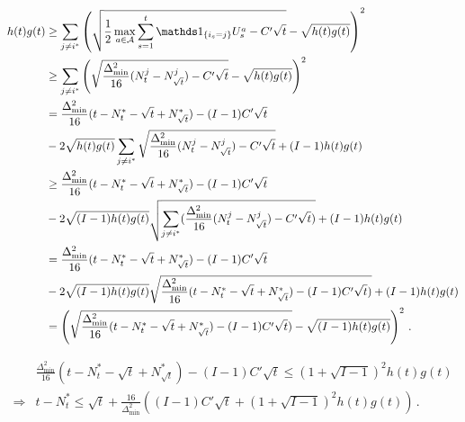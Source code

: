 \begin{align*}
    h(t)g(t) &\ge \sum_{j\neq i^*} \left(\sqrt{\frac{1}{2}\max_{a\in \mathcal A} \sum_{s=1}^t \ind_{\{i_s=j\}} U_s^a - C'\sqrt{t}} - \sqrt{h(t)g(t)}\right)^2\\
    &\ge \sum_{j\neq i^*} \left(\sqrt{\frac{\Delta_{\min}^2}{16} (N_t^j - N_{\sqrt{t}}^j) - C'\sqrt{t}} - \sqrt{h(t)g(t)}\right)^2\\
    &= \frac{\Delta_{\min}^2}{16} (t - N_t^* - \sqrt{t} + N_{\sqrt{t}}^*) - (I-1)C'\sqrt{t}\\
    &- 2\sqrt{h(t)g(t)}\sum_{j\neq i^*}\sqrt{\frac{\Delta_{\min}^2}{16} (N_t^j - N_{\sqrt{t}}^j) - C'\sqrt{t}} + (I-1)h(t)g(t)\\
    &\ge \frac{\Delta_{\min}^2}{16} (t - N_t^* - \sqrt{t} + N_{\sqrt{t}}^*) - (I-1)C'\sqrt{t}\\
    &- 2\sqrt{(I-1) h(t)g(t)}\sqrt{\sum_{j\neq i^*}(\frac{\Delta_{\min}^2}{16} (N_t^j - N_{\sqrt{t}}^j) - C'\sqrt{t})} + (I-1)h(t)g(t)\\
    &= \frac{\Delta_{\min}^2}{16} (t - N_t^* - \sqrt{t} + N_{\sqrt{t}}^*) - (I-1)C'\sqrt{t}\\
    &- 2\sqrt{(I-1) h(t)g(t)}\sqrt{\frac{\Delta_{\min}^2}{16} (t - N_t^* - \sqrt{t} + N_{\sqrt{t}}^*) - (I-1)C'\sqrt{t})} + (I-1)h(t)g(t)\\
    &= \left( \sqrt{\frac{\Delta_{\min}^2}{16} (t - N_t^* - \sqrt{t} + N_{\sqrt{t}}^*) - (I-1)C'\sqrt{t})} - \sqrt{(I-1) h(t)g(t)} \right)^2\,.
\end{align*}

\begin{align*}
    &\frac{\Delta_{\min}^2}{16} (t - N_t^* - \sqrt{t} + N_{\sqrt{t}}^*) - (I-1)C'\sqrt{t} \le (1 + \sqrt{I-1})^2 h(t)g(t)\\
    \Rightarrow
    &t - N_t^*
    \le \sqrt{t} + \frac{16}{\Delta_{\min}^2}\left((I-1)C'\sqrt{t} + (1 + \sqrt{I-1})^2 h(t)g(t)\right)\,.
\end{align*}